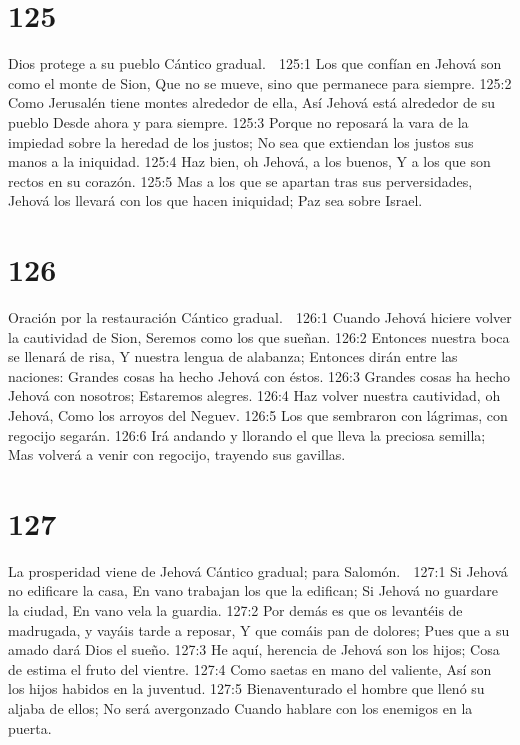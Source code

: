   

\chapter{125}

Dios protege a su pueblo 
Cántico gradual. 

125:1 Los que confían en Jehová son como el monte de Sion, 
Que no se mueve, sino que permanece para siempre. 
125:2 Como Jerusalén tiene montes alrededor de ella, 
Así Jehová está alrededor de su pueblo 
Desde ahora y para siempre. 
125:3 Porque no reposará la vara de la impiedad sobre la heredad de los justos; 
No sea que extiendan los justos sus manos a la iniquidad. 
125:4 Haz bien, oh Jehová, a los buenos, 
Y a los que son rectos en su corazón. 
125:5 Mas a los que se apartan tras sus perversidades, 
Jehová los llevará con los que hacen iniquidad; 
Paz sea sobre Israel. 

\chapter{126}

Oración por la restauración 
Cántico gradual. 

126:1 Cuando Jehová hiciere volver la cautividad de Sion, 
Seremos como los que sueñan. 
126:2 Entonces nuestra boca se llenará de risa, 
Y nuestra lengua de alabanza; 
Entonces dirán entre las naciones: 
Grandes cosas ha hecho Jehová con éstos. 
126:3 Grandes cosas ha hecho Jehová con nosotros; 
Estaremos alegres. 
126:4 Haz volver nuestra cautividad, oh Jehová, 
Como los arroyos del Neguev. 
126:5 Los que sembraron con lágrimas, con regocijo segarán. 
126:6 Irá andando y llorando el que lleva la preciosa semilla; 
Mas volverá a venir con regocijo, trayendo sus gavillas. 

\chapter{127}

La prosperidad viene de Jehová 
Cántico gradual; para Salomón. 

127:1 Si Jehová no edificare la casa, 
En vano trabajan los que la edifican; 
Si Jehová no guardare la ciudad, 
En vano vela la guardia. 
127:2 Por demás es que os levantéis de madrugada, y vayáis tarde a reposar, 
Y que comáis pan de dolores; 
Pues que a su amado dará Dios el sueño. 
127:3 He aquí, herencia de Jehová son los hijos; 
Cosa de estima el fruto del vientre. 
127:4 Como saetas en mano del valiente, 
Así son los hijos habidos en la juventud. 
127:5 Bienaventurado el hombre que llenó su aljaba de ellos; 
No será avergonzado 
Cuando hablare con los enemigos en la puerta. 

